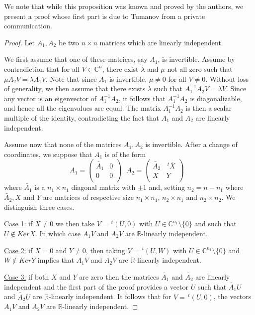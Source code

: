 \documentclass[12pt]{amsart}
\newcommand{\C}{\mathbb C}
\newcommand{\R}{\mathbb R}
\newcommand{\transp}{\,^t}
\theoremstyle{remark}
\theoremstyle{example}
\theoremstyle{definition}
\numberwithin{equation}{section}
\begin{document}
We note that while this proposition was known and proved by the authors, we present a  proof whose first part is due to Tumanov from a private communication.  
\begin{proof}
Let $A_1,A_2$ be two $n\times n$  matrices which are linearly independent. 

We first assume  that one of these matrices, say $A_1$, is invertible.
Assume by contradiction that for all  $V \in \C^n$, there exist $\lambda$  and  $\mu$  not all zero such that $\mu A_2V=\lambda A_1V.$ Note that since $A_1$ is invertible, $\mu \ne 0$ for all $V\ne 0.$  Without loss of generality, we  then assume that there exists  $\lambda$  such  that  $A_1^{-1}A_2V=\lambda V$. Since any vector is an eigenvector of  $A_1^{-1}A_2$, it follows that $A_1^{-1}A_2$ is diagonalizable, and hence all the eigenvalues are equal. The matrix $A_1^{-1}A_2$ is then  a scalar multiple of the identity, contradicting the fact that $A_1$ and $A_2$ are linearly independent.

\vspace{0.2cm} 
Assume now that none of the matrices $A_1,A_2$ is invertible. After a change of coordinates, we suppose that $A_1$ is of the form 
$$A_1=
 \begin{pmatrix} \tilde{A_1} & 0 \\ 
 0 & 0 \\
 \end{pmatrix} \ \ \ A_2= 
 \begin{pmatrix} \tilde{A_2} & \transp \overline{X} \\ 
 X & Y \\
 \end{pmatrix} \ \ \ $$
where $ \tilde{A_1}$ is a $n_1\times n_1$ diagonal matrix with $\pm 1$ and, setting $n_2=n-n_1$  where  $\tilde{A_2}, X$ and $Y$ are matrices of respective size $n_1\times n_1$,  $n_2 \times n_1$ and $n_2 \times n_2$. We distinguish three cases.    

\noindent \underline {Case 1:} if $X \neq 0$  we then take $V=\transp (U,0)$ with $U \in \C^{n_1} \setminus \{0\}$ and such that  $U \notin Ker X$. In which case $A_1V$ and $A_2 V$ are $\R$-linearly independent.

\noindent \underline {Case 2:} if $X=0$ and $Y \neq 0$, then taking $V=\transp (U,W)$ with $U \in \C^{n_1} \setminus \{0\}$ and $W \notin Ker Y$ implies that  $A_1V$ and $A_2 V$ are $\R$-linearly independent.

\noindent \underline {Case 3:} if both  $X$ and $Y$ are zero then the matrices $ \tilde{A_1}$ and $ \tilde{A_2}$ are linearly independent and the first part of the proof provides a vector $U$ such that  $\tilde{A_1}U$ and $ \tilde{A_2}U $ are $\R$-linearly independent. It follows that for $V=\transp (U,0)$, the vectors $A_1V$ and $A_2V$ are $\R$-linearly independent. 
\end{proof}
\end{document}
